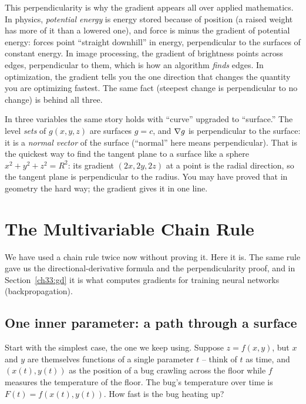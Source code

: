 \begin{aestheticbox}
This perpendicularity is why the gradient appears all over applied mathematics.
In physics, \emph{potential energy} is energy stored because of position (a raised
weight has more of it than a lowered one), and force is minus the gradient of
potential energy: forces point ``straight downhill'' in energy, perpendicular to
the surfaces of constant energy. In image processing, the gradient of brightness
points across edges, perpendicular to them, which is how an algorithm
\emph{finds} edges. In optimization, the gradient tells you the one direction that
changes the quantity you are optimizing fastest. The same fact (steepest change
is perpendicular to no change) is behind all three.
\end{aestheticbox}

\begin{connectionbox}
In three variables the same story holds with ``curve'' upgraded to ``surface.''
The level \emph{sets} of $g(x,y,z)$ are surfaces $g=c$, and $\nabla g$ is
perpendicular to the surface: it is a \emph{normal vector} of the surface
(``normal'' here means perpendicular). That is
the quickest way to find the tangent plane to a surface like a sphere
$x^2+y^2+z^2=R^2$: its gradient $(2x,2y,2z)$ at a point is the radial direction,
so the tangent plane is perpendicular to the radius. You may have proved that in
geometry the hard way; the gradient gives it in one line.
\end{connectionbox}

\section{The Multivariable Chain Rule}
\label{ch33:chain}

We have used a chain rule twice now without proving it. Here it is. The same rule
gave us the directional-derivative formula and the perpendicularity proof, and in
Section~\ref{ch33:gd} it is what computes gradients for training neural networks
(backpropagation).

\subsection{One inner parameter: a path through a surface}

Start with the simplest case, the one we keep using. Suppose $z=f(x,y)$, but $x$
and $y$ are themselves functions of a single parameter $t$ -- think of $t$ as
time, and $(x(t),y(t))$ as the position of a bug crawling across the floor while
$f$ measures the temperature of the floor. The bug's temperature over time is
$F(t)=f(x(t),y(t))$. How fast is the bug heating up?

